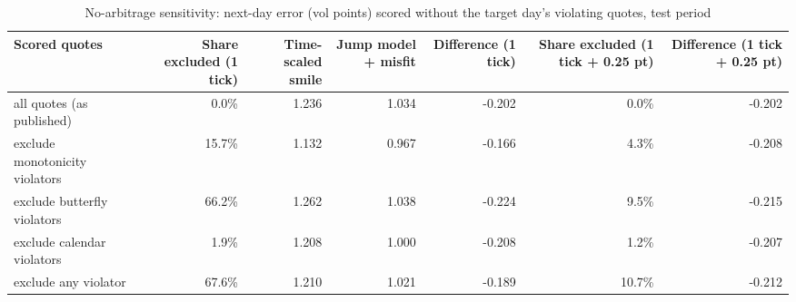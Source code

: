 \begin{table}[ht]
\centering
\small
\caption{No-arbitrage sensitivity: next-day error (vol points) scored without the target day's violating quotes, test period}
\begin{tabular}{lrrrrrr}
\toprule
Scored quotes & Share excluded (1 tick) & Time-scaled smile & Jump model + misfit & Difference (1 tick) & Share excluded (1 tick + 0.25 pt) & Difference (1 tick + 0.25 pt) \\
\midrule
all quotes (as published) & 0.0\% & 1.236 & 1.034 & -0.202 & 0.0\% & -0.202 \\
exclude monotonicity violators & 15.7\% & 1.132 & 0.967 & -0.166 & 4.3\% & -0.208 \\
exclude butterfly violators & 66.2\% & 1.262 & 1.038 & -0.224 & 9.5\% & -0.215 \\
exclude calendar violators & 1.9\% & 1.208 & 1.000 & -0.208 & 1.2\% & -0.207 \\
exclude any violator & 67.6\% & 1.210 & 1.021 & -0.189 & 10.7\% & -0.212 \\
\bottomrule
\end{tabular}
\par{}
\end{table}
